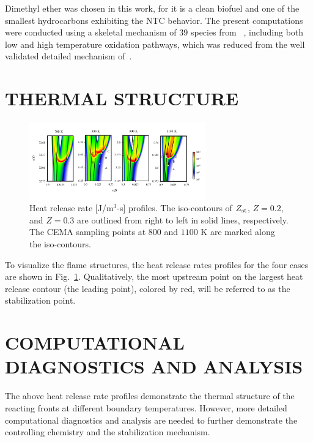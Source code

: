 \documentclass[twocolumn,10pt]{hphrc}
\begin{document}
Dimethyl ether was chosen in this work, for it is a clean biofuel and one of the smallest hydrocarbons exhibiting the NTC behavior.  The present computations were conducted using a skeletal mechanism of $39$ species from ~\cite{bansal11}, including both low and high temperature oxidation pathways, which was reduced from the well validated detailed mechanism of~\cite{zhao08}.

\section*{THERMAL STRUCTURE}

\begin{figure}[h]
  \centering
  \includegraphics[width=3in]{HRR}
  \caption{Heat release rate [J/m$^3$-s] profiles.  The iso-contours of $Z_{\rm st}$, $Z = 0.2$, and $Z = 0.3$ are outlined from right to left in solid lines, respectively.  The CEMA sampling points at $800$ and $1100$ K are marked along the iso-contours.}
  \label{fig:HRR}
\end{figure}

To visualize the flame structures, the heat release rates profiles for the four cases are shown in Fig.~\ref{fig:HRR}.  Qualitatively, the most upstream point on the largest heat release contour (the leading point), colored by red, will be referred to as the stabilization point.




\section*{COMPUTATIONAL DIAGNOSTICS AND ANALYSIS}

The above heat release rate profiles demonstrate the thermal structure of the reacting fronts at different boundary temperatures.  However, more detailed computational diagnostics and analysis are needed to further demonstrate the controlling chemistry and the stabilization mechanism.

\end{document}
